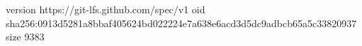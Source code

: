 version https://git-lfs.github.com/spec/v1
oid sha256:0913d5281a8bbaf405624bd022224e7a638e6acd3d5dc9adbcb65a5c33820937
size 9383
